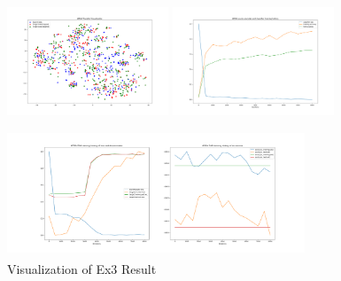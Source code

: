 \documentclass[conference]{IEEEtran}
\begin{document}
\begin{figure}[htb]
\label{fig:Ex3}
\centering
\begin{minipage}[t]{0.3\textwidth}
\includegraphics[width=1.9in, height=1.5in]{Ladda/A2R_no_bn/ADDA_visual.png}
\end{minipage}%
\begin{minipage}[t]{0.3\textwidth}
\includegraphics[width=1.9in, height=1.5in]{Ladda/A2R_no_bn/clf.png}
\end{minipage}%
\begin{minipage}[t]{0.45\textwidth}
\includegraphics[width=3.5in, height=1.5in]{Ladda/A2R_no_bn/gan.png}
\end{minipage}%
\caption{Visualization of Ex3 Result}
\end{figure}
\end{document}
